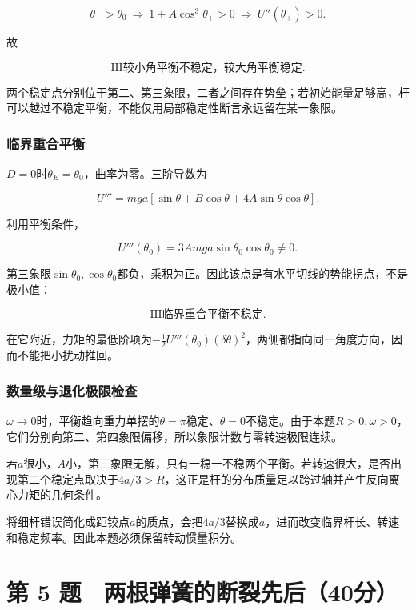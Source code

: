 \documentclass[12pt,a4paper,fontset=fandol]{ctexart}
\begin{document}
\[
\theta_+>\theta_0
\ \Longrightarrow\ 1+A\cos^3\theta_+>0
\ \Longrightarrow\ U''(\theta_+)>0.
\]

故

\[
\boxed{\mathrm{III}\text{较小角平衡不稳定，较大角平衡稳定}}.
\]

两个稳定点分别位于第二、第三象限，二者之间存在势垒；若初始能量足够高，杆可以越过不稳定平衡，不能仅用局部稳定性断言永远留在某一象限。

\subsubsection{临界重合平衡}\label{ux4e34ux754cux91cdux5408ux5e73ux8861}

\(D=0\)时\(\theta_E=\theta_0\)，曲率为零。三阶导数为

\[
U'''=mga[\sin\theta+B\cos\theta+4A\sin\theta\cos\theta].
\]

利用平衡条件，

\[
U'''(\theta_0)
=3Amga\sin\theta_0\cos\theta_0\neq0.
\]

第三象限\(\sin\theta_0,\cos\theta_0\)都负，乘积为正。因此该点是有水平切线的势能拐点，不是极小值：

\[
\boxed{\mathrm{III}\text{临界重合平衡不稳定}}.
\]

在它附近，力矩的最低阶项为\(-\tfrac12U'''(\theta_0)(\delta\theta)^2\)，两侧都指向同一角度方向，因而不能把小扰动推回。

\subsubsection{数量级与退化极限检查}\label{ux6570ux91cfux7ea7ux4e0eux9000ux5316ux6781ux9650ux68c0ux67e5}

\(\omega\to0\)时，平衡趋向重力单摆的\(\theta=\pi\)稳定、\(\theta=0\)不稳定。由于本题\(R>0,\omega>0\)，它们分别向第二、第四象限偏移，所以象限计数与零转速极限连续。

若\(a\)很小，\(A\)小，第三象限无解，只有一稳一不稳两个平衡。若转速很大，是否出现第二个稳定点取决于\(4a/3>R\)，这正是杆的分布质量足以跨过轴并产生反向离心力矩的几何条件。

将细杆错误简化成距铰点\(a\)的质点，会把\(4a/3\)替换成\(a\)，进而改变临界杆长、转速和稳定频率。因此本题必须保留转动惯量积分。

\clearpage

\section{第 5
题　两根弹簧的断裂先后（40分）}\label{ux7b2c-5-ux9898-ux4e24ux6839ux5f39ux7c27ux7684ux65adux88c2ux5148ux540e40ux5206}
\end{document}

